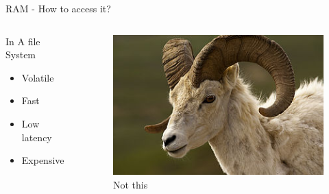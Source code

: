 \begin{frame}{RAM - How to access it?}
\begin{columns}
    \begin{column}{0.47\textwidth}
    \begin{block}{In A file System}
        \begin{itemize}
            \item Volatile 
            \item Fast
            \item Low latency
            \item Expensive
        \end{itemize}
    \end{block}
    \end{column}
    \begin{column}{0.47\textwidth}
        \begin{figure}
        \centering
        \includegraphics[width=\textwidth]{img/ram.jpg}
        \caption{Not this}
        \label{fig:my_label}
    \end{figure}
    \end{column}
\end{columns}
\end{frame}
